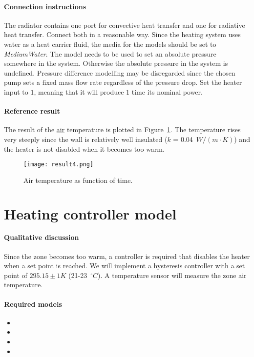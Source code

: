 \documentclass[10pt,a4paper]{article}
\begin{document}
\paragraph{Connection instructions}
The radiator contains one port for convective 
heat transfer and one for radiative heat transfer.
Connect both in a reasonable way.
Since the heating system uses water as a heat carrier fluid, 
the media for the models should be set to \textit{MediumWater}.
The  model needs to be used to set an absolute
pressure somewhere in the system. 
Otherwise the absolute 
pressure in the system is undefined.
Pressure difference modelling may be disregarded since the chosen pump
sets a fixed mass flow rate regardless of the pressure drop.
Set the heater input to 1, meaning that it will
produce 1 time its nominal power.

\paragraph{Reference result}
The result of the \underline{air} temperature 
is plotted in Figure~\ref{fig:res4}.
The temperature rises very steeply since the 
wall is relatively well insulated ($k$ = 0.04~$W/(m\cdot K)$)
and the heater is not disabled when it becomes too warm.

\begin{figure}[h!]
\centering
\texttt{[image: result4.png]}
\caption{Air temperature as function of time.}
\label{fig:res4}
\end{figure}

\newpage

\section{Heating controller model}
\paragraph{Qualitative discussion}
Since the zone becomes too warm, a controller
is required that disables the
heater when a set point is reached.
We will implement a hysteresis controller with a set point of $295.15 \pm 1 K$ 
(21-23~$^{\circ}C$).
A temperature sensor will measure the zone air temperature.


\paragraph{Required models}
\begin{itemize}
\item {}
\item {}
\item {}
\item {}
\end{itemize}
\end{document}
